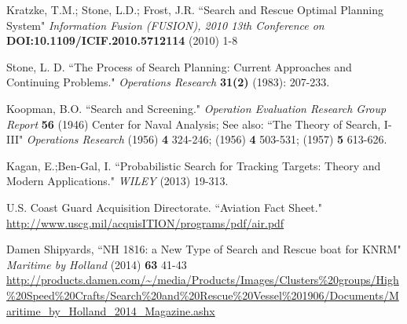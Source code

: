 \documentclass[12pt, letterpaper]{article}  %
\theoremstyle{definition}
\theoremstyle{remark}
\theoremstyle{plain}
\begin{document}
\begin{thebibliography}{99}





 Kratzke, T.M.; Stone, L.D.; Frost, J.R. ``Search and Rescue Optimal Planning System" \emph{Information Fusion (FUSION), 2010 13th Conference on} \textbf{DOI:10.1109/ICIF.2010.5712114} 
(2010) 1-8 

  Stone, L. D.  ``The Process of Search Planning: Current Approaches and Continuing Problems."  \emph{Operations Research} \textbf{31(2)} (1983): 207-233.

  Koopman, B.O.  ``Search and Screening."  \emph{Operation Evaluation Research Group Report} \textbf{56} (1946) Center for Naval Analysis; See also: ``The Theory of Search, I-III" \emph{Operations Research} (1956) \textbf{4} 324-246; (1956) \textbf{4} 503-531;  (1957) \textbf{5} 613-626. 

  Kagan, E.;Ben-Gal, I.  ``Probabilistic Search for Tracking Targets: Theory and Modern Applications."  \emph{WILEY} (2013) 19-313.



 U.S. Coast Guard Acquisition Directorate. ``Aviation Fact Sheet." \url{http://www.uscg.mil/acquisITION/programs/pdf/air.pdf}

 Damen Shipyards, ``NH 1816: a New Type of Search and Rescue boat for KNRM" \emph{Maritime by Holland} (2014) \textbf{63} 41-43
\url{http://products.damen.com/~/media/Products/Images/Clusters\%20groups/High\%20Speed\%20Crafts/Search\%20and\%20Rescue\%20Vessel\%201906/Documents/Maritime_by_Holland_2014_Magazine.ashx}

\end{thebibliography}

\end{document}

